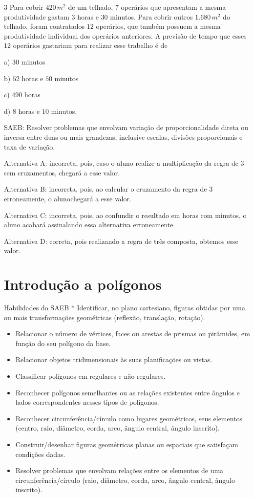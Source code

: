 \num{3}  Para cobrir $420\,m^2$ de um telhado, $7$ operários que apresentam a mesma
produtividade gastam $3$ horas e $30$ minutos. Para cobrir outros $1.680\,m^2$
do telhado, foram contratados $12$ operários, que também possuem a mesma
produtividade individual dos operários anteriores. A previsão de tempo
que esses $12$ operários gastariam para realizar esse trabalho é de

a) $30$ minutos

b) $52$ horas e $50$ minutos

c) $490$ horas

d) $8$ horas e $10$ minutos.

SAEB: Resolver problemas que envolvam variação de proporcionalidade
direta ou inversa entre duas ou mais grandezas, inclusive escalas,
divisões proporcionais e taxa de variação.

Alternativa A: incorreta, pois, caso o aluno realize a multiplicação da
regra de $3$ sem cruzamentos, chegará a esse valor.

Alternativa B: incorreta, pois, ao calcular o cruzamento da regra de $3$
erroneamente, o alunochegará a esse valor.

Alternativa C: incorreta, pois, ao confundir o resultado em horas com
minutos, o aluno acabará assinalando essa alternativa erroneamente.

Alternativa D: correta, pois realizando a regra de três composta,
obtemos esse valor.

\chapter{Introdução a polígonos}

Habilidades do SAEB * Identificar, no plano cartesiano, figuras obtidas
por uma ou mais transformações geométricas (reflexão, translação,
rotação).

\begin{itemize}
\item
  Relacionar o número de vértices, faces ou arestas de prismas ou
  pirâmides, em função do seu polígono da base.
\item
  Relacionar objetos tridimensionais às suas planificações ou vistas.
\item
  Classificar polígonos em regulares e não regulares.
\item
  Reconhecer polígonos semelhantes ou as relações existentes entre
  ângulos e lados correspondentes nesses tipos de polígonos.
\item
  Reconhecer circunferência/círculo como lugares geométricos, seus
  elementos (centro, raio, diâmetro, corda, arco, ângulo central, ângulo
  inscrito).
\item
  Construir/desenhar figuras geométricas planas ou espaciais que
  satisfaçam condições dadas.
\item
  Resolver problemas que envolvam relações entre os elementos de uma
  circunferência/círculo (raio, diâmetro, corda, arco, ângulo central,
  ângulo inscrito).
\end{itemize}

